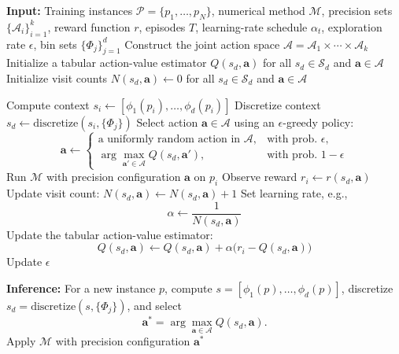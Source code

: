 \documentclass[Afour,sageh,times]{sagej}
\theoremstyle{plain}
\theoremstyle{definition}
\begin{document}
\begin{algorithm}
\caption{Contextual Bandit Framework for Precision Selection}
\label{alg:general_framework_corrected}
\begin{algorithmic}[1]
\State \textbf{Input:} Training instances $\mathcal{P}=\{p_1,\ldots,p_N\}$, numerical method $\mathcal{M}$, precision sets $\{\mathcal{A}_i\}_{i=1}^k$, reward function $r$, episodes $T$, learning-rate schedule $\alpha_t$, exploration rate $\epsilon$, bin sets $\{\Phi_j\}_{j=1}^d$
\State Construct the joint action space $\mathcal{A}=\mathcal{A}_1\times\cdots\times\mathcal{A}_k$
\State Initialize a tabular action-value estimator $Q(s_d,\mathbf{a})$ for all $s_d\in\mathcal{S}_d$ and $\mathbf{a}\in\mathcal{A}$
\State Initialize visit counts $N(s_d,\mathbf{a})\gets 0$ for all $s_d\in\mathcal{S}_d$ and $\mathbf{a}\in\mathcal{A}$

        \State Compute context $s_i \gets [\phi_1(p_i),\ldots,\phi_d(p_i)]$
        \State Discretize context $s_d \gets \mathrm{discretize}(s_i,\{\Phi_j\})$
        \State Select action $\mathbf{a}\in\mathcal{A}$ using an $\epsilon$-greedy policy:
        \[
        \mathbf{a} \gets
        \begin{cases}
        \text{a uniformly random action in }\mathcal{A}, & \text{with prob. }\epsilon,\\
        \arg\max_{\mathbf{a}'\in\mathcal{A}} Q(s_d,\mathbf{a}'), & \text{with prob. }1-\epsilon
        \end{cases}
        \]
        \State Run $\mathcal{M}$ with precision configuration $\mathbf{a}$ on $p_i$
        \State Observe reward $r_i \gets r(s_d,\mathbf{a})$
        \State Update visit count: $N(s_d,\mathbf{a}) \gets N(s_d,\mathbf{a}) + 1$
        \State Set learning rate, e.g.,
        \[
        \alpha \gets \frac{1}{N(s_d,\mathbf{a})}
        \]
        \State Update the tabular action-value estimator:
        \[
        Q(s_d,\mathbf{a}) \gets Q(s_d,\mathbf{a}) + \alpha\big(r_i - Q(s_d,\mathbf{a})\big)
        \]
    \EndFor
    \State Update $\epsilon$
\EndFor

\State \textbf{Inference:} For a new instance $p$, compute $s=[\phi_1(p),\ldots,\phi_d(p)]$, discretize $s_d=\mathrm{discretize}(s,\{\Phi_j\})$, and select
\[
\mathbf{a}^*=\arg\max_{\mathbf{a}\in\mathcal{A}} Q(s_d,\mathbf{a}).
\]
\State Apply $\mathcal{M}$ with precision configuration $\mathbf{a}^*$
\end{algorithmic}
\end{algorithm}
\end{document}
